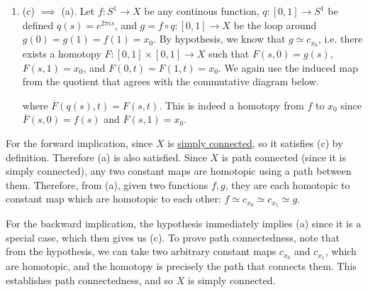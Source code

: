 \begin{solution}
\begin{enumerate}
				\begin{center}
				\end{center}

				By hypothesis, we can extend $\overline{f}$ to a continuous map $\overline{f}^\prime : D^2 \to X$. Define $q^\prime: [0, 1] \to D^2$ with $q^\prime (s) = q(s)$. Since $D^2$ is convex, we know $q^\prime \simeq c_{(1, 0)}$ (where $c_{(1, 0)}$ is the constant map to $(1, 0)$) defined by the linear homotopy $F(s, t) = (1 - t) q^\prime (s) + t(1, 0)$ relative to the endpoints. This satisfies $F(0, t) = F(1, t) = (1, 0)$. Therefore, $\overline{f}^\prime \circ F$ is a homotopy (relative to endpoints) from $f = \overline{f}^\prime \circ q^\prime$ to $\overline{f}^\prime \circ c_{(1, 0)} = x_0$. 

			\item (c) $\implies$ (a). Let $f: S^1 \to X$ be any continous function, $q: [0, 1] \to S^1$ be defined $q(s) = e^{2 \pi i s}$, and $g = f \circ q: [0, 1] \to X$ be the loop around $g(0) = g(1) = f(1) = x_0$. By hypothesis, we know that $g \simeq c_{x_0}$, i.e. there exists a homotopy $F: [0, 1] \times [0, 1] \to X$ such that $F(s, 0) = g(s)$, $F(s, 1) = x_0$, and $F(0, t) = F(1, t) = x_0$. We again use the induced map from the quotient that agrees with the commutative diagram below. 

				\begin{center}
				\end{center}

				where $\overline{F}(q(s), t) = F(s, t)$. This is indeed a homotopy from $f$ to $x_0$ since $\overline{F}(s, 0) = f(s)$ and $\overline{F}(s, 1) = x_0$. 
		\end{enumerate}

		For the forward implication, since $X$ is \hyperref[def:simply-connected]{simply connected}, so it satisfies (c) by definition. Therefore (a) is also satisfied. Since $X$ is path connected (since it is simply connected), any two constant maps are homotopic using a path between them. Therefore, from (a), given two functions $f, g$, they are each homotopic to constant map which are homotopic to each other: $f \simeq c_{x_0} \simeq c_{x_1} \simeq g$. 

		For the backward implication, the hypothesis immediately implies (a) since it is a special case, which then gives us (c). To prove path connectedness, note that from the hypothesis, we can take two arbitrary constant maps $c_{x_0}$ and $c_{x_1}$, which are homotopic, and the homotopy is precisely the path that connects them. This establishes path connectedness, and so $X$ is simply connected. 
	\end{solution}

